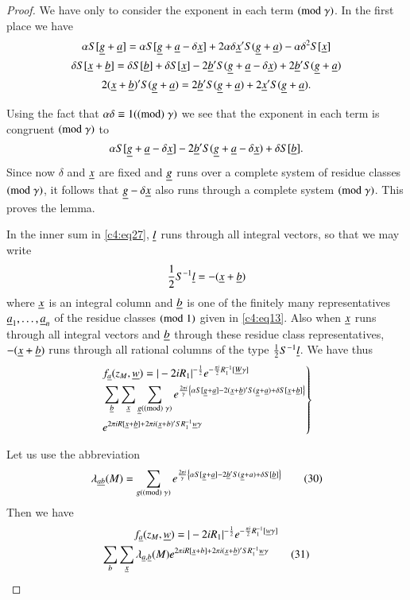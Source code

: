 \begin{proof}
We have only to consider the exponent in each term $(\rm{mod} \;\gamma)$. In
the first place we have 
\begin{gather*}
\alpha S[\underline{g}+\underline{a}]=\alpha S[\underline{g}+\underline{a}-\delta \underline{x}]+2\alpha
\delta \underline{x}'S(\underline{g}+\underline{a})-\alpha \delta^{2}S[\underline{x}]\\
\delta S[\underline{x}+\underline{b}]=\delta S[\underline{b}]+\delta
S[\underline{x}]-2\underline{b}'S(\underline{g}+\underline{a}-\delta\underline{x})+2\underline{b}'S(\underline{g}+\underline{a})\\
2(\underline{x}+\underline{b})'S(\underline{g}+\underline{a})=2\underline{b}'S(\underline{g}+\underline{a})+2\underline{x}'S(\underline{g}+\underline{a}). 
\end{gather*}

Using the fact that $\alpha\delta\equiv 1(\rm(mod) \; \gamma)$ we see that
the exponent in each term is congruent $(\rm{mod} \; \gamma)$ to 
$$
\alpha
S[\underline{g}+\underline{a}-\delta\underline{x}]-2\underline{b}'S(\underline{g}+\underline{a}-\delta\underline{x})+\delta
S[\underline{b}]. 
$$
Since now $\delta$ and $\underline{x}$ are fixed and $\underline{g}$ runs over a
complete system of residue classes $(\rm{mod} \; \gamma)$, it follows that
$\underline{g}-\delta \underline{x}$ also runs through a complete system
$(\rm{mod} \;\gamma)$. This proves the lemma.

In the inner sum in \eqref{c4:eq27}, $\underline{l}$ runs through all integral
vectors, so that we may write
$$
\frac{1}{2}S^{-1}\underline{l}=-(\underline{x}+\underline{b})
$$
where $\underline{x}$ is an integral column and $\underline{b}$ is one of the
finitely many representatives $\underline{a}_{1},\ldots,\underline{a}_{n}$ of the
residue classes $(\rm{mod} \; 1)$ given in \eqref{c4:eq13}. Also when $\underline{x}$ runs
through all integral vectors and $\underline{b}$ through these residue class
representatives, $-(\underline{x}+\underline{b})$ runs through all rational columns
of the type $\frac{1}{2}S^{-1}\underline{l}$. We have thus 
\begin{equation*}
\left.
\begin{aligned}
& f_{\underline{a}}(z_{M},\underline{w})=|-2iR_{1}|^{-\frac{1}{2}}e^{-\frac{\pi
      i}{2}R^{-1}_{1}[\underline{W}\gamma]}\\
& \sum_{\underline{b}}\sum_{\underline{x}}\sum_{\underline{g}(\rm(mod) \; \gamma)}e^{\frac{2\pi
      i}{\gamma}\left\{\alpha
    S[\underline{g}+\underline{a}]-2(\underline{x}+\underline{b})'S(\underline{g}+\underline{a})+\delta
    S[\underline{x}+\underline{b}]\right\}}\\
& e^{2\pi iR[\underline{x}+\underline{b}]+2\pi i(\underline{x}+b)'SR^{-1}_{1}\underline{w}\gamma}
\end{aligned}
\right\}
\end{equation*}\pageoriginale


Let us use the abbreviation
\begin{equation*}
\lambda_{\underline{a}\underline{b}}(M)=\sum_{g(\rm(mod) \; \gamma)}e^{\frac{2\pi
    i}{\gamma}\left\{\alpha
  S[\underline{g}+\underline{a}]-2\underline{b}'S(\underline{g}+a)+\delta
  S[\underline{b}]\right\}}\tag{30}\label{c4:eq30} 
\end{equation*}
Then we have
\begin{gather*}
f_{\underline{a}}(z_{M},\underline{w})=|-2iR_{1}|^{-\frac{1}{2}}e^{-\frac{\pi
      i}{2}R^{-1}_{1}[\underline{w}\gamma]}\\
\sum_{b}\sum_{\underline{x}}\lambda_{\underline{a},\underline{b}}(M)e^{2\pi
  iR[\underline{x}+b]+2\pi
  i(\underline{x}+\underline{b})'SR^{-1}_{1}\underline{w}\gamma}\tag{31}\label{c4:eq31} 
\end{gather*}


\end{proof}
